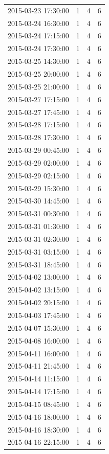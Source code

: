 \begin{tabular}{lrrr}
2015-03-23 17:30:00 & 1 & 4 & 6 \\
2015-03-24 16:30:00 & 1 & 4 & 6 \\
2015-03-24 17:15:00 & 1 & 4 & 6 \\
2015-03-24 17:30:00 & 1 & 4 & 6 \\
2015-03-25 14:30:00 & 1 & 4 & 6 \\
2015-03-25 20:00:00 & 1 & 4 & 6 \\
2015-03-25 21:00:00 & 1 & 4 & 6 \\
2015-03-27 17:15:00 & 1 & 4 & 6 \\
2015-03-27 17:45:00 & 1 & 4 & 6 \\
2015-03-28 17:15:00 & 1 & 4 & 6 \\
2015-03-28 17:30:00 & 1 & 4 & 6 \\
2015-03-29 00:45:00 & 1 & 4 & 6 \\
2015-03-29 02:00:00 & 1 & 4 & 6 \\
2015-03-29 02:15:00 & 1 & 4 & 6 \\
2015-03-29 15:30:00 & 1 & 4 & 6 \\
2015-03-30 14:45:00 & 1 & 4 & 6 \\
2015-03-31 00:30:00 & 1 & 4 & 6 \\
2015-03-31 01:30:00 & 1 & 4 & 6 \\
2015-03-31 02:30:00 & 1 & 4 & 6 \\
2015-03-31 03:15:00 & 1 & 4 & 6 \\
2015-03-31 18:45:00 & 1 & 4 & 6 \\
2015-04-02 13:00:00 & 1 & 4 & 6 \\
2015-04-02 13:15:00 & 1 & 4 & 6 \\
2015-04-02 20:15:00 & 1 & 4 & 6 \\
2015-04-03 17:45:00 & 1 & 4 & 6 \\
2015-04-07 15:30:00 & 1 & 4 & 6 \\
2015-04-08 16:00:00 & 1 & 4 & 6 \\
2015-04-11 16:00:00 & 1 & 4 & 6 \\
2015-04-11 21:45:00 & 1 & 4 & 6 \\
2015-04-14 11:15:00 & 1 & 4 & 6 \\
2015-04-14 17:15:00 & 1 & 4 & 6 \\
2015-04-15 08:45:00 & 1 & 4 & 6 \\
2015-04-16 18:00:00 & 1 & 4 & 6 \\
2015-04-16 18:30:00 & 1 & 4 & 6 \\
2015-04-16 22:15:00 & 1 & 4 & 6 \\

\end{tabular}
